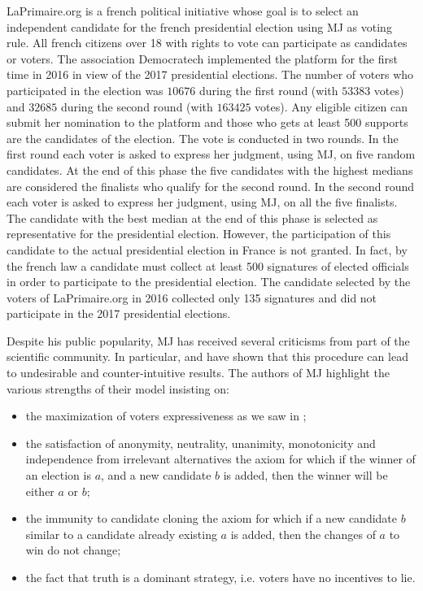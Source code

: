 LaPrimaire.org \citep{LaPrimaire} is a french political initiative whose goal is to select an independent candidate for the french presidential election using \ac{MJ} as voting rule. All french citizens over 18 with rights to vote can participate as candidates or voters. The association Democratech implemented the platform for the first time in 2016 in view of the 2017 presidential elections. The number of voters who participated in the election was $10676$ during the first round (with $53383$ votes) and $32685$ during the second round (with $163425$ votes).
Any eligible citizen can submit her nomination to the platform and those who gets at least 500 supports are the candidates of the election. The vote is conducted in two rounds.
In the first round each voter is asked to express her judgment, using \ac{MJ}, on five random candidates. At the end of this phase the five candidates with the highest medians are considered the finalists who qualify for the second round. In the second round each voter is asked to express her judgment, using \ac{MJ}, on all the five finalists. The candidate with the best median at the end of this phase is selected as representative for the presidential election.
However, the participation of this candidate to the actual presidential election in France is not granted. In fact, by the french law a candidate must collect at least 500 signatures of elected officials in order to participate to the presidential election. The candidate selected by the voters of LaPrimaire.org in 2016 collected only 135 signatures and did not participate in the 2017 presidential elections.  

Despite his public popularity, \ac{MJ} has received several criticisms from part of the scientific community. In particular, \citet{Felsenthal2008, Zahid2009} and \citet{Laslier2018} have shown that this procedure can lead to undesirable and counter-intuitive results.
The authors of \ac{MJ} highlight the various strengths of their model insisting on:
\begin{itemize}
	\item the maximization of voters expressiveness \textemdash as we saw in ;
	\item the satisfaction of anonymity, neutrality, unanimity, monotonicity and independence from irrelevant alternatives \textemdash the axiom for which if the winner of an election is $a$, and a new candidate $b$ is added, then the winner will be either $a$ or $b$;
	\item the immunity to candidate cloning \textemdash the axiom for which if a new candidate $b$ similar to a candidate already existing $a$ is added, then the changes of $a$ to win do not change;
	\item the fact that truth is a dominant strategy, i.e. voters have no incentives to lie.
\end{itemize}


